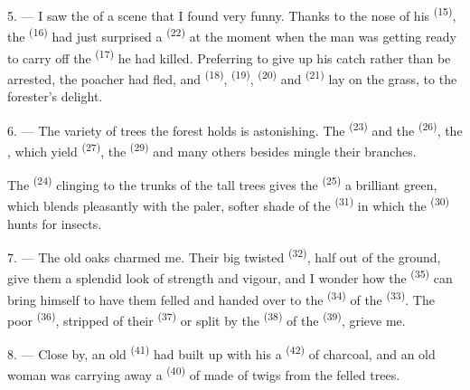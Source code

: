 \VUsaut{3.0mm}
\VUsaut{3.0mm}

5. --- I saw the  of a scene that I found very funny. Thanks to the nose of his
 \textsuperscript{(15)}, the  \textsuperscript{(16)} had
just surprised a  \textsuperscript{(22)} at the moment when the man was
getting ready to carry off the  \textsuperscript{(17)} he had killed. Preferring
to give up his catch rather than be arrested, the poacher had fled, and 
\textsuperscript{(18)},
 \textsuperscript{(19)},  \textsuperscript{(20)} and
 \textsuperscript{(21)} lay on the grass, to the forester's
delight.

6. --- The variety of trees the forest holds is astonishing. The
 \textsuperscript{(23)} and the  \textsuperscript{(26)}, the
, which yield  \textsuperscript{(27)}, the 
\textsuperscript{(29)} and many others besides mingle their branches.

The  \textsuperscript{(24)} clinging to the trunks of the tall trees gives the
 \textsuperscript{(25)} a brilliant green, which blends pleasantly with the
paler, softer shade of the  \textsuperscript{(31)} in which the
 \textsuperscript{(30)} hunts for insects.

\VUsaut{3.0mm}
\VUsaut{3.0mm}

7. --- The old oaks charmed me. Their big twisted  \textsuperscript{(32)}, half
out of the ground, give them a splendid look of strength and vigour, and I wonder how the
 \textsuperscript{(35)} can bring himself to have them felled and handed over to
the
 \textsuperscript{(34)} of the  \textsuperscript{(33)}. The
poor  \textsuperscript{(36)}, stripped of their 
\textsuperscript{(37)} or split by the  \textsuperscript{(38)} of the
 \textsuperscript{(39)}, grieve me.

8. --- Close by, an old  \textsuperscript{(41)} had built up with his
 a  \textsuperscript{(42)} of charcoal, and an old woman was
carrying away a  \textsuperscript{(40)} of
 made of twigs from the felled trees.

